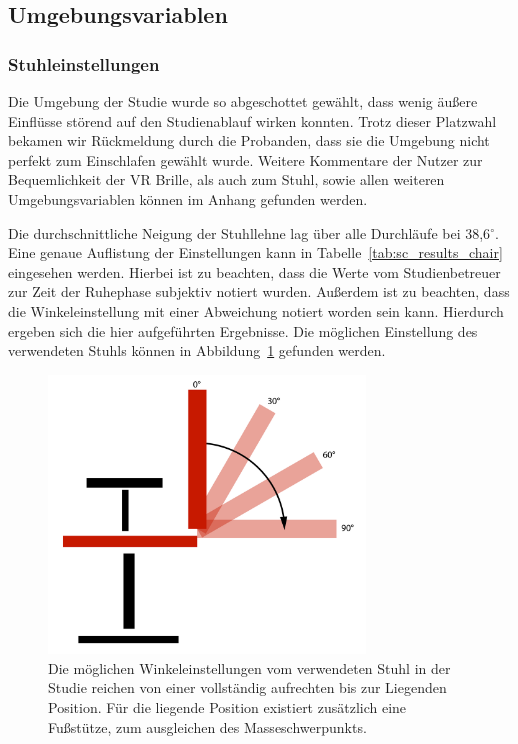 \subsection{Umgebungsvariablen}
\subsubsection{Stuhleinstellungen}

Die Umgebung der Studie wurde so abgeschottet gewählt, dass wenig äußere Einflüsse störend auf den Studienablauf wirken konnten. Trotz dieser Platzwahl bekamen wir Rückmeldung durch die Probanden, dass sie die Umgebung nicht perfekt zum Einschlafen gewählt wurde. Weitere Kommentare der Nutzer zur Bequemlichkeit der VR Brille, als auch zum Stuhl, sowie allen weiteren Umgebungsvariablen können im Anhang gefunden werden.

Die durchschnittliche Neigung der Stuhllehne lag über alle Durchläufe bei 38,6$^\circ$. Eine genaue Auflistung der Einstellungen kann in Tabelle~\ref{tab:sc_results_chair} eingesehen werden. Hierbei ist zu beachten, dass die Werte vom Studienbetreuer zur Zeit der Ruhephase subjektiv notiert wurden. Außerdem ist zu beachten, dass die Winkeleinstellung mit einer Abweichung notiert worden sein kann. Hierdurch ergeben sich die hier aufgeführten Ergebnisse. Die möglichen Einstellung des verwendeten Stuhls können in Abbildung~\ref{fig:chair_backrest} gefunden werden.

\begin{figure}[H]
	\centering
	\includegraphics[width=0.75\textwidth]{./images/chair}
	\caption{Die möglichen Winkeleinstellungen vom verwendeten Stuhl in der Studie reichen von einer vollständig aufrechten bis zur Liegenden Position. Für die liegende Position existiert zusätzlich eine Fußstütze, zum ausgleichen des Masseschwerpunkts.}
	\label{fig:chair_backrest}
\end{figure}

